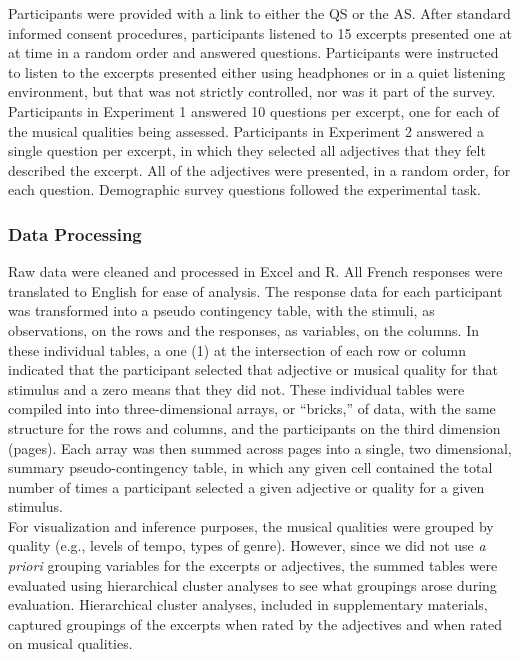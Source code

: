 \documentclass[
  english,
  man,floatsintext]{apa6}
\begin{document}
Participants were provided with a link to either the QS or the AS. After standard informed consent procedures, participants listened to 15 excerpts presented one at at time in a random order and answered questions. Participants were instructed to listen to the excerpts presented either using headphones or in a quiet listening environment, but that was not strictly controlled, nor was it part of the survey. Participants in Experiment 1 answered 10 questions per excerpt, one for each of the musical qualities being assessed. Participants in Experiment 2 answered a single question per excerpt, in which they selected all adjectives that they felt described the excerpt. All of the adjectives were presented, in a random order, for each question. Demographic survey questions followed the experimental task.

\hypertarget{data-processing}{%
\subsubsection{Data Processing}\label{data-processing}}

Raw data were cleaned and processed in Excel and R. All French responses were translated to English for ease of analysis. The response data for each participant was transformed into a pseudo contingency table, with the stimuli, as observations, on the rows and the responses, as variables, on the columns. In these individual tables, a one (1) at the intersection of each row or column indicated that the participant selected that adjective or musical quality for that stimulus and a zero means that they did not. These individual tables were compiled into into three-dimensional arrays, or ``bricks,'' of data, with the same structure for the rows and columns, and the participants on the third dimension (pages). Each array was then summed across pages into a single, two dimensional, summary pseudo-contingency table, in which any given cell contained the total number of times a participant selected a given adjective or quality for a given stimulus.\\
For visualization and inference purposes, the musical qualities were grouped by quality (e.g., levels of tempo, types of genre). However, since we did not use \emph{a priori} grouping variables for the excerpts or adjectives, the summed tables were evaluated using hierarchical cluster analyses to see what groupings arose during evaluation. Hierarchical cluster analyses, included in supplementary materials, captured groupings of the excerpts when rated by the adjectives and when rated on musical qualities.
\end{document}

